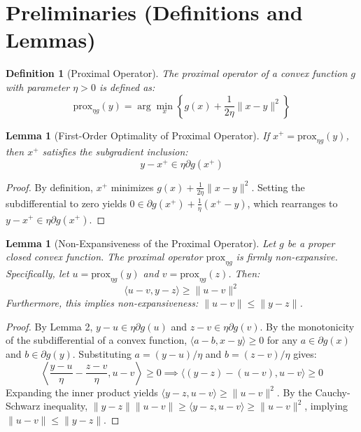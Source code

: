 \documentclass{article}
\newtheorem{lemma}[theorem]{Lemma}
\newtheorem{definition}[theorem]{Definition}
\begin{document}
\section*{Preliminaries (Definitions and Lemmas)}
\begin{definition}[Proximal Operator]
The proximal operator of a convex function $g$ with parameter $\eta > 0$ is defined as:
\begin{equation}
\text{prox}_{\eta g}(y) = \arg\min_{x} \left\{ g(x) + \frac{1}{2\eta} \|x - y\|^2 \right\}
\end{equation}
\end{definition}

\begin{lemma}[First-Order Optimality of Proximal Operator]
If $x^+ = \text{prox}_{\eta g}(y)$, then $x^+$ satisfies the subgradient inclusion:
\begin{equation}
y - x^+ \in \eta \partial g(x^+)
\end{equation}
\end{lemma}

\begin{proof}
By definition, $x^+$ minimizes $g(x) + \frac{1}{2\eta}\|x-y\|^2$. Setting the subdifferential to zero yields $0 \in \partial g(x^+) + \frac{1}{\eta}(x^+ - y)$, which rearranges to $y - x^+ \in \eta \partial g(x^+)$.
\end{proof}

\begin{lemma}[Non-Expansiveness of the Proximal Operator]
Let $g$ be a proper closed convex function. The proximal operator $\text{prox}_{\eta g}$ is firmly non-expansive. Specifically, let $u = \text{prox}_{\eta g}(y)$ and $v = \text{prox}_{\eta g}(z)$. Then:
\begin{equation}
\langle u - v, y - z \rangle \geq \|u - v\|^2
\end{equation}
Furthermore, this implies non-expansiveness: $\|u - v\| \leq \|y - z\|$.
\end{lemma}

\begin{proof}
By Lemma 2, $y - u \in \eta \partial g(u)$ and $z - v \in \eta \partial g(v)$. By the monotonicity of the subdifferential of a convex function, $\langle a - b, x - y \rangle \geq 0$ for any $a \in \partial g(x)$ and $b \in \partial g(y)$. Substituting $a = (y-u)/\eta$ and $b = (z-v)/\eta$ gives:
\begin{equation}
\left\langle \frac{y-u}{\eta} - \frac{z-v}{\eta}, u - v \right\rangle \geq 0 \implies \langle (y - z) - (u - v), u - v \rangle \geq 0
\end{equation}
Expanding the inner product yields $\langle y - z, u - v \rangle \geq \|u - v\|^2$. By the Cauchy-Schwarz inequality, $\|y - z\| \|u - v\| \geq \langle y - z, u - v \rangle \geq \|u - v\|^2$, implying $\|u - v\| \leq \|y - z\|$.
\end{proof}
\end{document}
